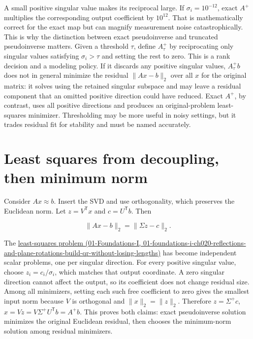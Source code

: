A small positive singular value makes its reciprocal large. If \(\sigma_i=10^{-12}\), exact \(A^+\) multiplies the corresponding output coefficient by \(10^{12}\). That is mathematically correct for the exact map but can magnify measurement noise catastrophically. This is why the distinction between exact pseudoinverse and truncated pseudoinverse matters. Given a threshold \(\tau\), define \(A_\tau^+\) by reciprocating only singular values satisfying \(\sigma_i>\tau\) and setting the rest to zero. This is a rank decision and a modeling policy. If it discards any positive singular values, \(A_\tau^+b\) does not in general minimize the residual \(\|Ax-b\|_2\) over all \(x\) for the original matrix: it solves using the retained singular subspace and may leave a residual component that an omitted positive direction could have reduced. Exact \(A^+\), by contrast, uses all positive directions and produces an original-problem least-squares minimizer. Thresholding may be more useful in noisy settings, but it trades residual fit for stability and must be named accurately.

\section{Least squares from decoupling, then minimum norm}\label{02-foundations-ii-ch024-least-squares-from-decoupling-then-minimum-norm}

Consider \(Ax\approx b\). Insert the SVD and use orthogonality, which preserves the Euclidean norm. Let \(z=V^\mathsf T x\) and \(c=U^\mathsf T b\). Then

\[
\|Ax-b\|_2=\|\Sigma z-c\|_2.
\]

The \href{../01-Foundations-I/main.pdf\#nameddest=01-foundations-i-ch020-reflections-and-plane-rotations-build-qr-without-losing-lengths}{least-squares problem (01-Foundations-I, 01-foundations-i-ch020-reflections-and-plane-rotations-build-qr-without-losing-lengths)} has become independent scalar problems, one per singular direction. For every positive singular value, choose \(z_i=c_i/\sigma_i\), which matches that output coordinate. A zero singular direction cannot affect the output, so its coefficient does not change residual size. Among all minimizers, setting each such free coefficient to zero gives the smallest input norm because \(V\) is orthogonal and \(\|x\|_2=\|z\|_2\). Therefore \(z=\Sigma^+c\), \(x=Vz=V\Sigma^+U^\mathsf T b=A^+b\). This proves both claims: exact pseudoinverse solution minimizes the original Euclidean residual, then chooses the minimum-norm solution among residual minimizers.

